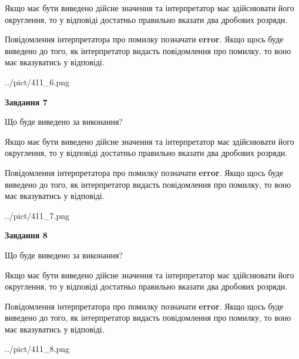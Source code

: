 \documentclass[12pt, ukrainian]{article}
\begin{document}
{\begin {Large}
Якщо має бути виведено дійсне значення та інтерпретатор має здійснювати його округлення, 
то у відповіді достатньо правильно вказати два дробових розряди.

Повідомлення інтерпретатора про помилку позначати \textbf{error}.
Якщо щось буде виведено до того, як інтерпретатор видасть повідомлення про помилку, 
то воно має вказуватись у відповіді. \par

\begin{center}
	{../pict/411_6.png}
\end{center}
\newpage

{\begin {center}\textbf{Завдання 7}\end {center}}\par
Що буде виведено за виконання? \par

Якщо має бути виведено дійсне значення та інтерпретатор має здійснювати його округлення, 
то у відповіді достатньо правильно вказати два дробових розряди.

Повідомлення інтерпретатора про помилку позначати \textbf{error}.
Якщо щось буде виведено до того, як інтерпретатор видасть повідомлення про помилку, 
то воно має вказуватись у відповіді. \par

\begin{center}
	{../pict/411_7.png}
\end{center}
\newpage

{\begin {center}\textbf{Завдання 8}\end {center}}\par
Що буде виведено за виконання? \par

Якщо має бути виведено дійсне значення та інтерпретатор має здійснювати його округлення, 
то у відповіді достатньо правильно вказати два дробових розряди.

Повідомлення інтерпретатора про помилку позначати \textbf{error}.
Якщо щось буде виведено до того, як інтерпретатор видасть повідомлення про помилку, 
то воно має вказуватись у відповіді. \par

\begin{center}
	{../pict/411_8.png}
\end{center}
\newpage


\end{Large}}
\end{document}
